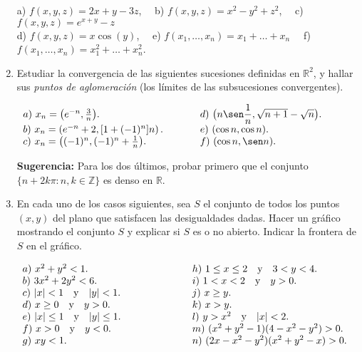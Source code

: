 \documentclass[11pt]{article}
\newcommand{\R}{\mathbb{R}}
\begin{document}
\begin{enumerate}
a) $f(x,y,z)=2x+y-3z$, \ \ b) $f(x,y,z)=x^2-y^2+z^2$, \ \ c) $f(x,y,z)=e^{x+y}-z$ \\
d) $f(x,y,z)= x\cos(y)$, \ \ e) $f(x_1,\dots,x_n)=x_1+\dots+x_n$ \ \ f) $f(x_1,\dots,x_n)=x_1^2+\dots+x_n^2$.  

\item Estudiar la convergencia de las siguientes sucesiones definidas en $\R^2$, y hallar sus {\em puntos de aglomeraci\'on} (los l\'imites de las subsucesiones convergentes).
       
      \begin{flushleft}$\begin{array}{lll}
       a)\ x_{n}=\big(e^{-n},{3\over n} \big). &\hspace{4ex}&d)\
       \big(n\sen\dfrac{1}{n},\sqrt{n+1}-\sqrt{n}\big). 
        \\
       b)\ x_{n}=\left( e^{-n}+2,[1+(-1)^{n}]n \right).&&e)\ (\cos
       n,\cos n). \\
       c)\ x_{n}=\big( (-1)^{n},(-1)^{n}+{1\over n} \big).&&f)\ (\cos
       n,\sen n). \\
       \end{array}$\end{flushleft}
{\bf Sugerencia:} Para los dos \'ultimos, probar primero que el conjunto $\{n+2k\pi:n,k\in\mathbb{Z}\}$ es denso en $\R$.


\item En cada      uno de los 
      casos siguientes, sea $S$ el conjunto de todos los puntos
      $(x,y)$ del plano que satisfacen las desigualdades dadas. Hacer
      un gr\'afico mostrando el conjunto $S$ y explicar si $S$ es o no abierto. Indicar la frontera
      de $S$ en el gr\'afico.
      \begin{flushleft}$  
      \begin{array}{lll}
      a)\ x^2+y^2<1. &\hspace{12ex} & h)\ 1\leq x\leq 2 \ \ \textrm{ y
      }\ \  3<y<4.\\ 
      b)\ 3x^2+2y^2<6.& & i)\ 1<x<2 \ \ \textrm{ y }\ \  y>0.\\
      c)\ |x|<1\ \ \textrm{ y }\ \ |y|<1.& & j)\ x\geq y.\\
      d)\ x\geq 0\ \ \textrm{ y }\ \ y>0.& & k)\ x>y.\\
      e)\ |x|\leq 1\ \ \textrm{ y }\ \ |y|\leq 1.& & l)\ y>x^2\ \
        \textrm{ y }\ \ |x|<2.\\ 
      f)\ x>0\ \ \textrm{ y }\ \ y<0.& & m)\ (x^2+y^2-1)(4-x^2-y^2)>0.\\
      g)\ xy<1.& & n)\ (2x-x^2-y^2)(x^2+y^2-x)>0.\\
      \end{array}$\end{flushleft}


\end{enumerate}
\end{document}
